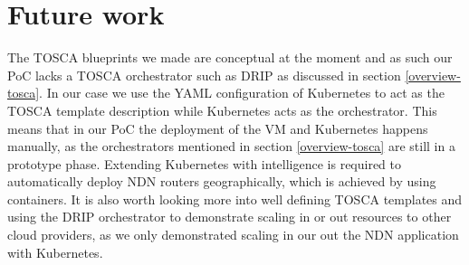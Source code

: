 \section{Future work}\label{fut}

The TOSCA blueprints we made are conceptual at the moment and as such our PoC lacks a TOSCA orchestrator such as DRIP as discussed in section \ref{overview-tosca}. In our case we use the YAML configuration of Kubernetes to act as the TOSCA template description while Kubernetes acts as the orchestrator. This means that in our PoC the deployment of the VM and Kubernetes happens manually, as the orchestrators mentioned in section \ref{overview-tosca} are still in a prototype phase. 
Extending Kubernetes with intelligence is required to automatically deploy NDN routers geographically, which is achieved by using containers.
It is also worth looking more into well defining TOSCA templates and using the DRIP orchestrator to demonstrate scaling in or out resources to other cloud providers, as we only demonstrated scaling in our out the NDN application with Kubernetes. 


